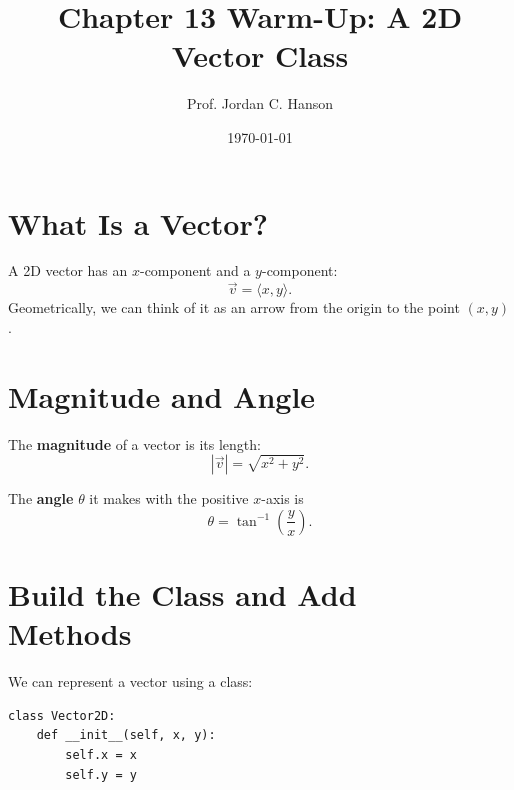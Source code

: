 \documentclass[11pt]{article}
\begin{document}
\twocolumn

\title{Chapter 13 Warm-Up: A 2D Vector Class}
\author{Prof. Jordan C. Hanson}
\date{\today}
\maketitle

\section{What Is a Vector?}

A 2D vector has an \(x\)-component and a \(y\)-component:
\[
\vec{v} = \langle x, y \rangle .
\]
Geometrically, we can think of it as an arrow from the origin to the
point \((x,y)\).

\begin{center}
\end{center}

\section{Magnitude and Angle}

The \textbf{magnitude} of a vector is its length:
\[
|\vec{v}| = \sqrt{x^2 + y^2}.
\]

The \textbf{angle} \(\theta\) it makes with the positive \(x\)-axis is
\[
\theta = \tan^{-1}\left(\frac{y}{x}\right).
\]

\section{Build the Class and Add \\ Methods}

We can represent a vector using a class:

\begin{verbatim}
class Vector2D:
    def __init__(self, x, y):
        self.x = x
        self.y = y
\end{verbatim}
\end{document}
